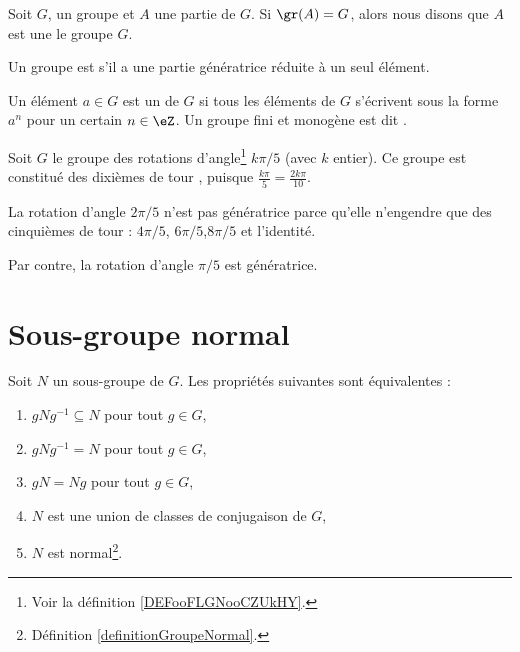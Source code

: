 \begin{definition}  \label{DEFooWMFVooLDqVxR}
    Soit \( G\), un groupe et \( A\) une partie de \( G\). Si \( \gr(A)=G\), alors nous disons que \( A\) est une  le groupe \( G\).

    Un groupe est  s'il a une partie génératrice réduite à un seul élément.
\end{definition}

\begin{definition}     \label{DefHFJWooFxkzCF}
    Un élément \( a\in G\) est un  de \( G\) si tous les éléments de \( G\) s'écrivent sous la forme \( a^n\) pour un certain \( n\in\eZ\). Un groupe fini et monogène est dit .
\end{definition}


\begin{example}
    Soit \( G\) le groupe des rotations d'angle\footnote{Voir la définition \ref{DEFooFLGNooCZUkHY}.} \( k\pi/5\) (avec \( k \) entier). Ce groupe est constitué des \og{} dixièmes de tour \fg{}, puisque \( \frac{k\pi} 5 = \frac{2k\pi}{10}.\)
    
     La rotation d'angle \( 2 \pi/5\)  n'est pas génératrice parce qu'elle n'engendre que des \og{} cinquièmes de tour \fg{} : \( 4 \pi/5\), \( 6 \pi/ 5\),\( 8\pi/5\) et l'identité.
     
     Par contre, la rotation d'angle \( \pi/5\) est génératrice.
\end{example}

\section{Sous-groupe normal}

\begin{proposition}\label{propGroupeNormal}
    Soit \( N\) un sous-groupe de \( G\). Les propriétés suivantes sont équivalentes :
    \begin{enumerate}
        \item
            \( gNg^{-1}\subseteq N\) pour tout \( g\in G\),
        \item
            \( gNg^{-1}= N\) pour tout \( g\in G\),
        \item
            \( gN=Ng\) pour tout \( g\in G\),
        \item
            \( N\) est une union de classes de conjugaison de \( G\),
        \item
            \( N\) est normal\footnote{Définition \ref{definitionGroupeNormal}.}.
    \end{enumerate}
\end{proposition}

